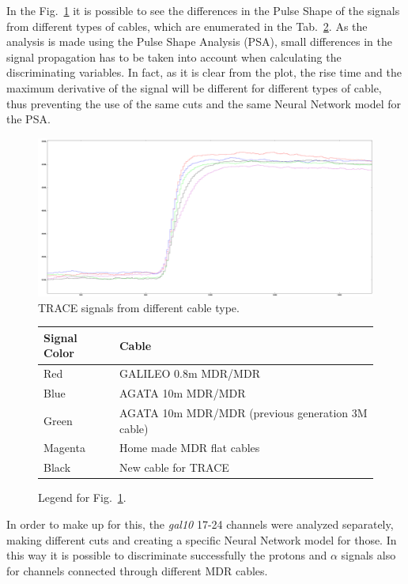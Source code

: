 \bigbreak

In the Fig.~\ref{cable} it is possible to see the differences in the Pulse
Shape of the signals from different types of cables, which are enumerated in
the Tab.~\ref{cables}. As the analysis is made using the Pulse Shape Analysis
(PSA), small differences in the signal propagation has to be taken into
account when calculating the discriminating variables. In fact, as it is clear
from the plot, the rise time and the maximum derivative of the signal will be
different for different types of cable, thus preventing the use of the same
cuts and the same Neural Network model for the PSA.

\bigbreak

\begin{figure}[h]
  \centering
  \includegraphics[scale=.16]{img/cabling.png}
  \caption{TRACE signals from different cable type.}
  \label{cable}
\end{figure}

\begin{figure}
  \begin{tabular}{ll}
    Signal Color & Cable \\
    \midrule
    Red & GALILEO 0.8m MDR/MDR \\
    Blue & AGATA 10m MDR/MDR \\
    Green & AGATA 10m MDR/MDR (previous generation 3M cable) \\
    Magenta & Home made MDR flat cables \\
    Black & New cable for TRACE \\
    \bottomrule
  \end{tabular}
  \caption{Legend for Fig.~\ref{cable}.}
  \label{cables}
\end{figure}

\bigbreak

In order to make up for this, the \textit{gal10} 17-24 channels were analyzed
separately, making different cuts and creating a specific Neural Network model
for those. In this way it is possible to discriminate successfully the
protons and $\alpha$ signals also for channels connected through different MDR
cables.